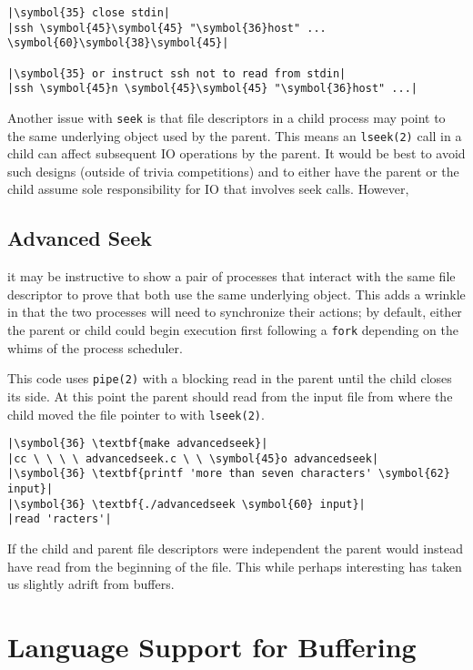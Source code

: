 \documentclass[10pt,a4paper]{article}
\begin{document}
\begin{lstlisting}
|\symbol{35} close stdin|
|ssh \symbol{45}\symbol{45} "\symbol{36}host" ... \symbol{60}\symbol{38}\symbol{45}|

|\symbol{35} or instruct ssh not to read from stdin|
|ssh \symbol{45}n \symbol{45}\symbol{45} "\symbol{36}host" ...|
\end{lstlisting}

Another issue with \texttt{seek} is that file descriptors in a child
process may point to the same underlying object used by the parent.
This means an \texttt{lseek(2)} call in a child can affect
subsequent IO operations by the parent. It would be best to avoid
such designs (outside of trivia competitions) and to either have the
parent or the child assume sole responsibility for IO that involves
seek calls. However,

\subsection*{Advanced Seek}

it may be instructive to show a pair of processes that interact with the
same file descriptor to prove that both use the same underlying object.
This adds a wrinkle in that the two processes will need to synchronize
their actions; by default, either the parent or child could begin
execution first following a \texttt{fork} depending on the whims of the
process scheduler.



This code uses \texttt{pipe(2)} with a blocking read in the parent until
the child closes its side. At this point the parent should read from the
input file from where the child moved the file pointer to with
\texttt{lseek(2)}.

\begin{lstlisting}
|\symbol{36} \textbf{make advancedseek}|
|cc \ \ \ \ advancedseek.c \ \ \symbol{45}o advancedseek|
|\symbol{36} \textbf{printf 'more than seven characters' \symbol{62} input}|
|\symbol{36} \textbf{./advancedseek \symbol{60} input}|
|read 'racters'|
\end{lstlisting}

If the child and parent file descriptors were independent the parent
would instead have read from the beginning of the file. This while
perhaps interesting has taken us slightly adrift from buffers.

\section*{Language Support for Buffering}
\end{document}
